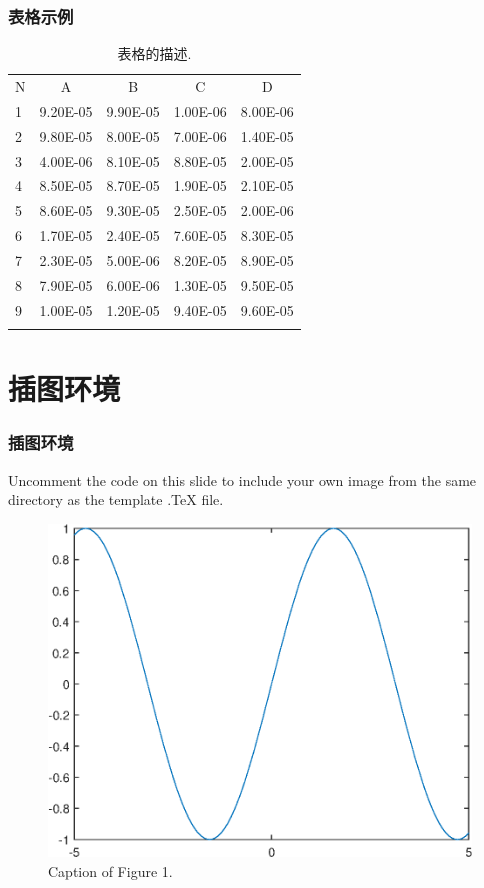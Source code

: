\documentclass[notheorems]{beamer}
\theoremstyle{plain}
\numberwithin{theorem}{section}
\numberwithin{definition}{section}
\numberwithin{lemma}{section}
\numberwithin{proposition}{section}
\numberwithin{corollary}{section}
\theoremstyle{example}
\numberwithin{figure}{section}
\numberwithin{table}{section}
\numberwithin{equation}{section}
\begin{document}

\begin{frame}
\frametitle{表格示例}
\begin{table}[htp!]
\centering
\renewcommand\arraystretch{1.0} %
\caption{表格的描述.}
\label{tab3:NumError}
\begin{tabularx}{0.9\textwidth}{|P{1cm}|C|C|C|C|}
\Xhline{2\arrayrulewidth}
N  & A       & B    & C  & D   \\
\Xhline{2\arrayrulewidth}
1  & 9.20E-05 & 9.90E-05 & 1.00E-06 & 8.00E-06  \\
2  & 9.80E-05 & 8.00E-05 & 7.00E-06 & 1.40E-05  \\
3  & 4.00E-06 & 8.10E-05 & 8.80E-05 & 2.00E-05 \\
4  & 8.50E-05 & 8.70E-05 & 1.90E-05 & 2.10E-05 \\
5 & 8.60E-05 & 9.30E-05 & 2.50E-05 & 2.00E-06  \\
6 & 1.70E-05 & 2.40E-05 & 7.60E-05 & 8.30E-05  \\
7 & 2.30E-05 & 5.00E-06 & 8.20E-05 & 8.90E-05 \\
8 & 7.90E-05 & 6.00E-06 & 1.30E-05 & 9.50E-05  \\
9 & 1.00E-05 & 1.20E-05 & 9.40E-05 & 9.60E-05 \\
\Xhline{2\arrayrulewidth}
\end{tabularx}
\end{table}

\end{frame}


\section{插图环境}

\begin{frame}
\frametitle{插图环境}

Uncomment the code on this slide to include your own image from the same directory as the template .TeX file.
\begin{figure}[htp!]
\centering
\includegraphics[width=0.5\linewidth]{image1}
\caption{Caption of Figure 1.} \label{fig:A}
\end{figure}
\end{frame}
\end{document}
